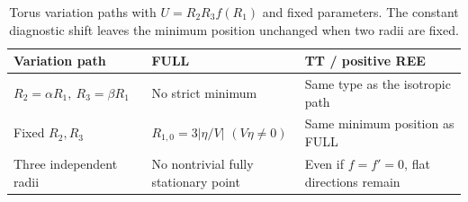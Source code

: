 \begin{table}[htbp]
\centering
\small
\caption{Torus variation paths with $U=R_2R_3f(R_1)$ and fixed parameters. The constant diagnostic shift leaves the minimum position unchanged when two radii are fixed.}\label{tab:v3:7}
\setlength{\tabcolsep}{4pt}
\renewcommand{\arraystretch}{1.25}
\begin{tabularx}{\linewidth}{>{\raggedright\arraybackslash}X>{\raggedright\arraybackslash}X>{\raggedright\arraybackslash}X}
\toprule
Variation path & FULL & TT / positive REE \\
\midrule
$R_2=\alpha R_1,\ R_3=\beta R_1$ & No strict minimum & Same type as the isotropic path \\
Fixed $R_2,R_3$ & $R_{1,0}=3\lvert\eta/V\rvert$ $(V\eta\ne0)$ & Same minimum position as FULL \\
Three independent radii & No nontrivial fully stationary point & Even if $f=f'=0$, flat directions remain \\
\bottomrule
\end{tabularx}
\end{table}
